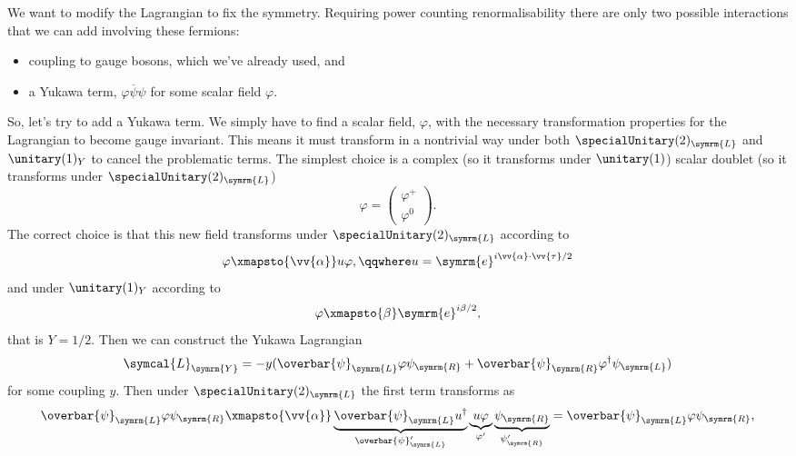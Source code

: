 \documentclass[fleqn]{NotesClass}
\newcommand{\e}{\symrm{e}}
\newcommand{\diracadjoint}[1]{\overbar{#1}}
\newcommand{\hermit}{\dagger}
\newcommand{\lagrangianDensity}{\symcal{L}}
\newcommand{\Left}{\symrm{L}}
\newcommand{\Right}{\symrm{R}}
\begin{document}
    We want to modify the Lagrangian to fix the symmetry.
    Requiring power counting renormalisability there are only two possible interactions that we can add involving these fermions:
    \begin{itemize}
        \item coupling to gauge bosons, which we've already used, and
        \item a Yukawa term, \(\varphi\diracadjoint{\psi}\psi\) for some scalar field \(\varphi\).
    \end{itemize}
    So, let's try to add a Yukawa term.
    We simply have to find a scalar field, \(\varphi\), with the necessary transformation properties for the Lagrangian to become gauge invariant.
    This means it must transform in a nontrivial way under both \(\specialUnitary(2)_{\Left}\) and \(\unitary(1)_{Y}\) to cancel the problematic terms.
    The simplest choice is a complex (so it transforms under \(\unitary(1)\)) scalar doublet (so it transforms under \(\specialUnitary(2)_{\Left}\))
    \begin{equation}
        \varphi = 
        \begin{pmatrix}
            \varphi^+\\ \varphi^0
        \end{pmatrix}
        .
    \end{equation}
    The correct choice is that this new field transforms under \(\specialUnitary(2)_{\Left}\) according to
    \begin{equation}
        \varphi \xmapsto{\vv{\alpha}} u\varphi, \qqwhere u = \e^{i\vv{\alpha} \cdot \vv{\tau} / 2}
    \end{equation}
    and under \(\unitary(1)_Y\) according to
    \begin{equation}
        \varphi \xmapsto{\beta} \e^{i\beta/2},
    \end{equation}
    that is \(Y = 1/2\).
    Then we can construct the Yukawa Lagrangian
    \begin{equation}
        \lagrangianDensity_{\symrm{Y}} = -y(\diracadjoint{\psi}_{\Left}\varphi\psi_{\Right} + \diracadjoint{\psi}_{\Right}\varphi^\hermit \psi_{\Left})
    \end{equation}
    for some coupling \(y\).
    Then under \(\specialUnitary(2)_{\Left}\) the first term transforms as
    \begin{equation}
        \diracadjoint{\psi}_{\Left}\varphi\psi_{\Right} \xmapsto{\vv{\alpha}} \underbrace{\diracadjoint{\psi}_{\Left}u^\hermit}_{\diracadjoint{\psi}_{\Left}'} \underbrace{u\varphi}_{\varphi'} \underbrace{\psi_{\Right}}_{\psi_{\Right}'} = \diracadjoint{\psi}_{\Left}\varphi\psi_{\Right},
    \end{equation}
\end{document}
